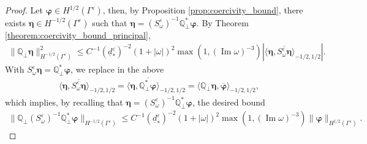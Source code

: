 \documentclass[]{article}
\numberwithin{equation}{section}
\numberwithin{theorem}{section}
\numberwithin{lemma}{section}
\numberwithin{corollary}{section}
\numberwithin{proposition}{section}
\numberwithin{definition}{section}
\newcommand{\re}{\varepsilon}
\renewcommand{\vec}{\boldsymbol}
\renewcommand{\Im}{\operatorname{Im}}
\begin{document}
	\begin{proof}
		Let $\vec{\varphi}\in H^{1/2}(\Gamma^{\re})$, then, by Proposition \ref{prop:coercivity_bound}, there exists $\vec{\eta} \in H^{-1/2}(\Gamma^{\re})$ such that $ \vec{\eta} =  (S^{\re}_{\omega})^{-1} \mathbb{Q}^*_{\perp} \vec{\varphi}$.
		By Theorem \ref{theorem:coercivity_bound_principal}, 
		\begin{align}
			\label{eq:qperp_bound}
			\| \mathbb{Q}_{\perp} \vec{\eta} \|^2
			_{H^{-1/2}(\Gamma^{\re})}\leq C^{-1} (\underline{d}^{\re}_*)^{-2} (1+|\omega|)^{2} \max(1, (\Im \omega)^{-3}) \left|\langle \vec{\eta}, \overline{S^{\re}_{\omega}\vec{\eta}}\rangle_{-1/2, 1/2} \right|.
		\end{align}
		With $S^{\re}_{\omega}\vec{\eta}=\mathbb{Q}^*_{\perp} \vec{\varphi}$, we replace in the above
		\begin{align*}%
			\langle \vec{\eta}, \overline{S^{\re}_{\omega}\vec{\eta}}\rangle_{-1/2, 1/2} =	\langle \vec{\eta}, \overline{\mathbb{Q}^*_{\perp} \vec{\varphi}}\rangle_{-1/2, 1/2}=\langle \mathbb{Q}_{\perp}\vec{\eta}, \overline{\vec{\varphi}}\rangle_{-1/2, 1/2},
		\end{align*}
		which implies, by recalling that $\vec{\eta}=(S^{\re}_{\omega})^{-1} \mathbb{Q}^*_{\perp}\vec{\varphi}$, the desired bound
		\begin{align*}%
			\| \mathbb{Q}_{\perp} (S^{\re}_{\omega})^{-1} \mathbb{Q}^*_{\perp}\vec{\varphi}\|_{H^{-1/2}(\Gamma^{\re})}\leq  C^{-1} (\underline{d}^{\re}_*)^{-2} (1+|\omega|)^{2} \max(1, (\Im \omega)^{-3})\|\vec{\varphi}\|_{H^{1/2}(\Gamma^{\re})}.
		\end{align*}	
	\end{proof}
\end{document}

